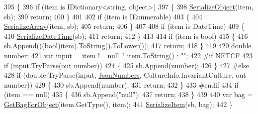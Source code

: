 \begin{DoxyCode}
395         \{
396             \textcolor{keywordflow}{if} (item is IDictionary<string, object>)
397             \{
398                 \hyperlink{a00046_a2a63df270c38b1c9ce7de54b268cdc4f}{SerializeObject}(item, sb);
399                 \textcolor{keywordflow}{return};
400             \}
401 
402             \textcolor{keywordflow}{if} (item is IEnumerable)
403             \{
404                 \hyperlink{a00046_a38298480de46941b764cbbae3ec00ac0}{SerializeArray}(item, sb);
405                 \textcolor{keywordflow}{return};
406             \}
407 
408             \textcolor{keywordflow}{if} (item is DateTime)
409             \{
410                 \hyperlink{a00046_a6874a321c86a87ddeafb25e1f5b37a42}{SerializeDateTime}(sb);
411                 \textcolor{keywordflow}{return};
412             \}
413 
414             \textcolor{keywordflow}{if} (item is \textcolor{keywordtype}{bool})
415             \{
416                 sb.Append(((bool)item).ToString().ToLower());
417                 \textcolor{keywordflow}{return};
418             \}
419 
420             \textcolor{keywordtype}{double} number;
421             var input = item != null ? item.ToString() : \textcolor{stringliteral}{""};
422 \textcolor{preprocessor}{#if NETCF}
423 \textcolor{preprocessor}{}            \textcolor{keywordflow}{if} (input.TryParse(out number))
424             \{
425                 sb.Append(number);
426             \}
427 \textcolor{preprocessor}{#else}
428 \textcolor{preprocessor}{}            \textcolor{keywordflow}{if} (\textcolor{keywordtype}{double}.TryParse(input, \hyperlink{a00046_ad05db33540abe9864b13b6b5c637a354}{JsonNumbers}, CultureInfo.InvariantCulture, out number))
429             \{
430                 sb.Append(number);
431                 \textcolor{keywordflow}{return};
432             \}
433 \textcolor{preprocessor}{#endif}
434 \textcolor{preprocessor}{}            \textcolor{keywordflow}{if} (item == null)
435             \{
436                 sb.Append(\textcolor{stringliteral}{"null"});
437                 \textcolor{keywordflow}{return};
438             \}
439 
440             var bag = \hyperlink{a00046_a3589b9943dbb8872cd4030d4b9ff1a7a}{GetBagForObject}(item.GetType(), item);
441             \hyperlink{a00046_a1ce11382c35fcbc0902e73deec3e617b}{SerializeItem}(sb, bag);
442         \}
\end{DoxyCode}
